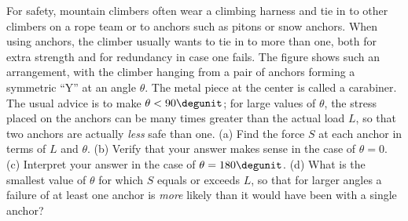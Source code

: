 For safety, mountain climbers often wear a climbing harness and tie in to other climbers on a rope
team or to anchors such as pitons or snow anchors. When using anchors, the climber usually wants to tie in
to more than one, both for extra strength and for redundancy in case one fails.
The figure shows such an arrangement, with the climber hanging from a pair of anchors forming a symmetric ``Y''
at an angle $\theta$. The metal piece at the center is called a carabiner.
The usual advice is to make $\theta<90\degunit$; for large values of $\theta$,
the stress placed on the anchors can be many times greater than the actual load $L$,
so that two anchors are actually \emph{less} safe than one.\hwendpart
(a) Find the force $S$ at each anchor in terms of $L$ and $\theta$.  \answercheck\hwendpart
(b) Verify that your answer makes sense in the case of $\theta=0$.\hwendpart
(c) Interpret your answer in the case of $\theta=180\degunit$.\hwendpart
(d) What is the smallest value of $\theta$ for which $S$ equals or exceeds $L$, so that for larger angles a failure
of at least one anchor is \emph{more} likely than it would have been with a single anchor?\answercheck\hwendpart
